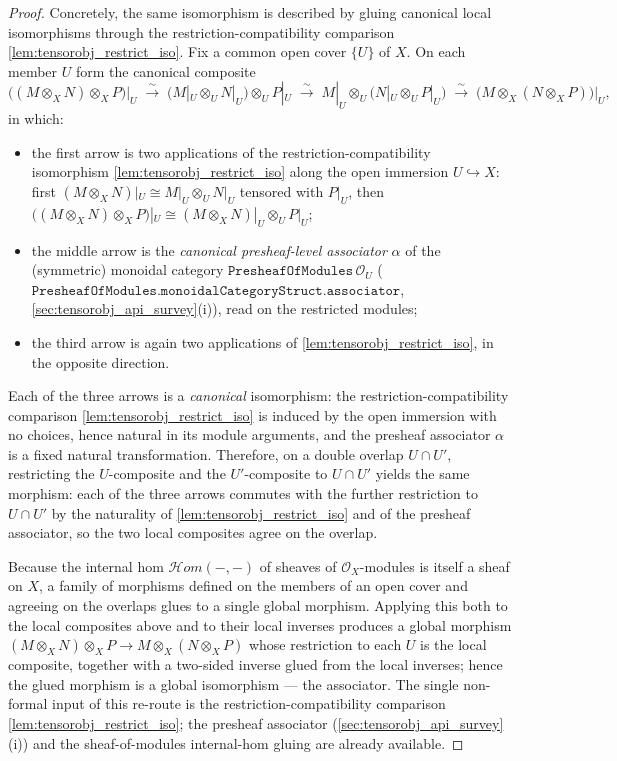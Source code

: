 \begin{proof}
  Concretely, the same isomorphism is described by gluing canonical local isomorphisms
  through the restriction-compatibility comparison \cref{lem:tensorobj_restrict_iso}.
  Fix a
  common open cover \(\{U\}\) of \(X\). On each member \(U\) form the canonical
  composite
  \[
    \bigl((M \otimes_X N) \otimes_X P\bigr)\big|_U
      \;\xrightarrow{\ \sim\ }\;
    \bigl(M|_U \otimes_U N|_U\bigr) \otimes_U P|_U
      \;\xrightarrow{\ \sim\ }\;
    M|_U \otimes_U \bigl(N|_U \otimes_U P|_U\bigr)
      \;\xrightarrow{\ \sim\ }\;
    \bigl(M \otimes_X (N \otimes_X P)\bigr)\big|_U ,
  \]
  in which:
  \begin{itemize}
    \item the first arrow is two applications of the restriction-compatibility
      isomorphism \cref{lem:tensorobj_restrict_iso} along the open immersion
      \(U \hookrightarrow X\): first \((M \otimes_X N)|_U \cong M|_U \otimes_U
      N|_U\) tensored with \(P|_U\), then \(\bigl((M \otimes_X N) \otimes_X
      P\bigr)|_U \cong (M \otimes_X N)|_U \otimes_U P|_U\);
    \item the middle arrow is the \emph{canonical presheaf-level associator}
      \(\alpha\) of the (symmetric) monoidal category
      \(\mathtt{PresheafOfModules}\,\mathcal{O}_U\)
      (\(\mathtt{PresheafOfModules.monoidalCategoryStruct.associator}\),
      \cref{sec:tensorobj_api_survey}(i)), read on the restricted modules;
    \item the third arrow is again two applications of
      \cref{lem:tensorobj_restrict_iso}, in the opposite direction.
  \end{itemize}
  Each of the three arrows is a \emph{canonical} isomorphism: the
  restriction-compatibility comparison \cref{lem:tensorobj_restrict_iso} is induced
  by the open immersion with no choices, hence natural in its module arguments, and
  the presheaf associator \(\alpha\) is a fixed natural transformation. Therefore,
  on a double overlap \(U \cap U'\), restricting the \(U\)-composite and the
  \(U'\)-composite to \(U \cap U'\) yields the same morphism: each of the three
  arrows commutes with the further restriction to \(U \cap U'\) by the naturality of
  \cref{lem:tensorobj_restrict_iso} and of the presheaf associator, so the two local
  composites agree on the overlap.

  Because the internal hom \(\mathcal{H}om(-,-)\) of sheaves of
  \(\mathcal{O}_X\)-modules is itself a sheaf on \(X\), a family of morphisms defined
  on the members of an open cover and agreeing on the overlaps glues to a single
  global morphism. Applying this both to the local composites above and to their
  local inverses produces a global morphism
  \((M \otimes_X N) \otimes_X P \to M \otimes_X (N \otimes_X P)\) whose restriction
  to each \(U\) is the local composite, together with a two-sided inverse glued from
  the local inverses; hence the glued morphism is a global isomorphism --- the
  associator. The single non-formal input of this re-route is the
  restriction-compatibility comparison \cref{lem:tensorobj_restrict_iso}; the presheaf
  associator (\cref{sec:tensorobj_api_survey}(i)) and the sheaf-of-modules
  internal-hom gluing are already available.


\end{proof}
